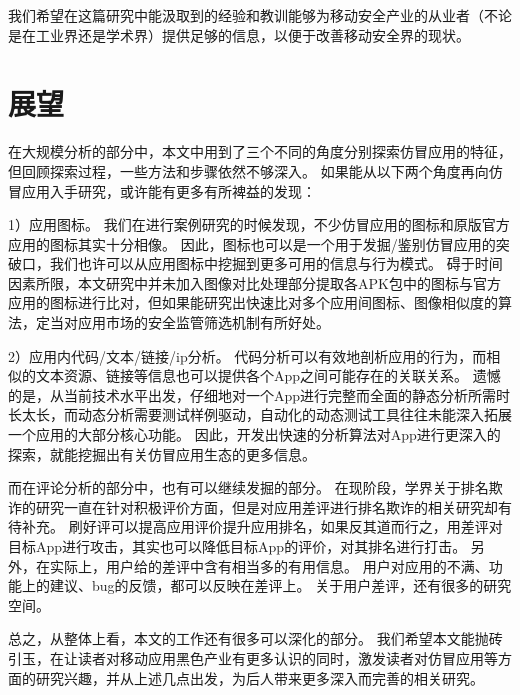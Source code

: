 我们希望在这篇研究中能汲取到的经验和教训能够为移动安全产业的从业者（不论是在工业界还是学术界）提供足够的信息，以便于改善移动安全界的现状。

\section{展望}

在大规模分析的部分中，本文中用到了三个不同的角度分别探索仿冒应用的特征，但回顾探索过程，一些方法和步骤依然不够深入。
如果能从以下两个角度再向仿冒应用入手研究，或许能有更多有所裨益的发现：

1）应用图标。
我们在进行案例研究的时候发现，不少仿冒应用的图标和原版官方应用的图标其实十分相像。
因此，图标也可以是一个用于发掘/鉴别仿冒应用的突破口，我们也许可以从应用图标中挖掘到更多可用的信息与行为模式。
碍于时间因素所限，本文研究中并未加入图像对比处理部分提取各APK包中的图标与官方应用的图标进行比对，但如果能研究出快速比对多个应用间图标、图像相似度的算法，定当对应用市场的安全监管筛选机制有所好处。

2）应用内代码/文本/链接/ip分析。
代码分析可以有效地剖析应用的行为，而相似的文本资源、链接等信息也可以提供各个App之间可能存在的关联关系。
遗憾的是，从当前技术水平出发，仔细地对一个App进行完整而全面的静态分析所需时长太长，而动态分析需要测试样例驱动，自动化的动态测试工具往往未能深入拓展一个应用的大部分核心功能。
因此，开发出快速的分析算法对App进行更深入的探索，就能挖掘出有关仿冒应用生态的更多信息。

而在评论分析的部分中，也有可以继续发掘的部分。
在现阶段，学界关于排名欺诈的研究一直在针对积极评价方面，但是对应用差评进行排名欺诈的相关研究却有待补充。
刷好评可以提高应用评价提升应用排名，如果反其道而行之，用差评对目标App进行攻击，其实也可以降低目标App的评价，对其排名进行打击。
另外，在实际上，用户给的差评中含有相当多的有用信息。
用户对应用的不满、功能上的建议、bug的反馈，都可以反映在差评上。
关于用户差评，还有很多的研究空间。

总之，从整体上看，本文的工作还有很多可以深化的部分。
我们希望本文能抛砖引玉，在让读者对移动应用黑色产业有更多认识的同时，激发读者对仿冒应用等方面的研究兴趣，并从上述几点出发，为后人带来更多深入而完善的相关研究。
